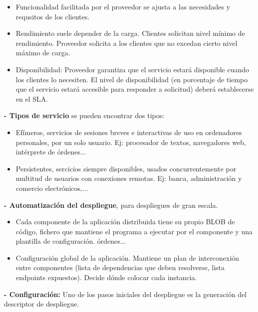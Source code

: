 \documentclass[12pt]{amsart}
\begin{document}
    \begin{itemize}
    
    \item  Funcionalidad facilitada por el proveedor se ajusta a las necesidades y requsitos de los clientes.
    
    \item  Rendimiento suele depender de la carga. Clientes solicitan nivel mínimo de rendimiento. Proveedor solicita a los clientes que no excedan cierto nivel máximo de carga.
    
    \item  Disponibilidad: Proveedor garantiza que el servicio estará disponible cuando los clientes lo necesiten. El nivel de disponibilidad (en porcentaje de tiempo que el servicio estará accesible para responder a  solicitud) deberá establecerse en el SLA.
    
    \end{itemize}
    
    \textbf{- Tipos de servicio} se pueden encontrar dos tipos:
    \begin{itemize}
    
    \item  Efímeros, servicios de sesiones breves e interactivas de uso en ordenadores personales, por un solo usuario. Ej: procesador de textos, navegadores web, intérprete de órdenes...
    
    \item  Persistentes, sercicios siempre disponibles, usados concurrentemente por multitud de usuarios con conexiones remotas. Ej: banca, administración y comercio electrónicos,...
    \end{itemize}
    
    \textbf{- Automatización del despliegue}, para despliegues de gran escala. \begin{itemize}
    
    \item  Cada componente de la aplicación distribuida tiene su propio BLOB de código, fichero que mantiene el programa a ejecutar por el componente y una plantilla de configuración. órdenes...
    
    \item  Configuración global de la aplicación. Mantiene un plan de interconexión entre componentes (lista de dependencias que deben resolverse, lista endpoints expuestos). Decide dónde colocar cada instancia. 
    \end{itemize}
    
    \textbf{- Configuración:} Uno de los pasos iniciales del despliegue es la generación del descriptor de despliegue.
    
\end{document}
